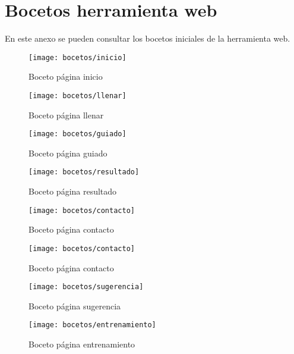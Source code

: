 \chapter{Bocetos herramienta web}
\label{cap:AnexoF}

En este anexo se pueden consultar los bocetos iniciales de la herramienta web.

\begin{figure}[htb]
  \centering
    \texttt{[image: bocetos/inicio]}
  \caption[Boceto página inicio]{Boceto página inicio}
  \label{fig:Boceto página inicio}
\end{figure}

\begin{figure}[htb]
  \centering
    \texttt{[image: bocetos/llenar]}
  \caption[Boceto página llenar]{Boceto página llenar}
  \label{fig:Boceto página llenar}
\end{figure}

\begin{figure}[htb]
  \centering
    \texttt{[image: bocetos/guiado]}
  \caption[Boceto página guiado]{Boceto página guiado}
  \label{fig:Boceto página guiado}
\end{figure}

\begin{figure}[htb]
  \centering
    \texttt{[image: bocetos/resultado]}
  \caption[Boceto página resultado]{Boceto página resultado}
  \label{fig:Boceto página resultado}
\end{figure}

\begin{figure}[htb]
  \centering
    \texttt{[image: bocetos/contacto]}
  \caption[Boceto página contacto]{Boceto página contacto}
  \label{fig:Boceto página contacto}
\end{figure}

\begin{figure}[htb]
  \centering
    \texttt{[image: bocetos/contacto]}
  \caption[Boceto página contacto]{Boceto página contacto}
  \label{fig:Boceto página contacto}
\end{figure}

\begin{figure}[htb]
  \centering
    \texttt{[image: bocetos/sugerencia]}
  \caption[Boceto página sugerencia]{Boceto página sugerencia}
  \label{fig:Boceto página llenar}
\end{figure}

\begin{figure}[htb]
  \centering
    \texttt{[image: bocetos/entrenamiento]}
  \caption[Boceto página entrenamiento]{Boceto página entrenamiento}
  \label{fig:Boceto página entrenamiento}
\end{figure}
